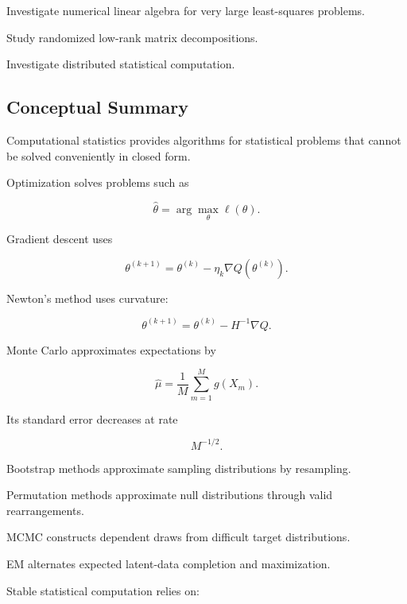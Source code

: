 \begin{exercise}[4]
Investigate numerical linear algebra for very large least-squares
problems.
\end{exercise}

\begin{exercise}[4]
Study randomized low-rank matrix decompositions.
\end{exercise}

\begin{exercise}[4]
Investigate distributed statistical computation.
\end{exercise}

\subsection{Conceptual Summary}
\label{subsec:computational-statistics-summary}

Computational statistics provides algorithms for statistical problems
that cannot be solved conveniently in closed form.

Optimization solves problems such as

\[
\boxed{
\widehat{\theta}
=
\arg\max_\theta
\ell(\theta).
}
\]

Gradient descent uses

\[
\boxed{
\theta^{(k+1)}
=
\theta^{(k)}
-
\eta_k
\nabla Q
(
\theta^{(k)}
).
}
\]

Newton's method uses curvature:

\[
\boxed{
\theta^{(k+1)}
=
\theta^{(k)}
-
H^{-1}
\nabla Q.
}
\]

Monte Carlo approximates expectations by

\[
\boxed{
\widehat{\mu}
=
\frac1M
\sum_{m=1}^{M}
g(X_m).
}
\]

Its standard error decreases at rate

\[
\boxed{
M^{-1/2}.
}
\]

Bootstrap methods approximate sampling distributions by resampling.

Permutation methods approximate null distributions through valid
rearrangements.

MCMC constructs dependent draws from difficult target distributions.

EM alternates expected latent-data completion and maximization.

Stable statistical computation relies on:

